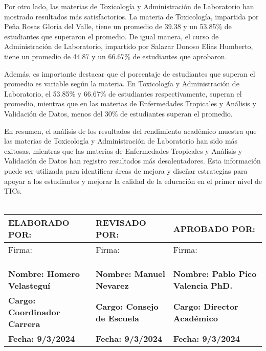 Por otro lado, las materias de Toxicología y Administración de Laboratorio han mostrado resultados más satisfactorios. La materia de Toxicología, impartida por Peña Rosas Gloria del Valle, tiene un promedio de 39.38 y un 53.85\% de estudiantes que superaron el promedio. De igual manera, el curso de Administración de Laboratorio, impartido por Salazar Donoso Elias Humberto, tiene un promedio de 44.87 y un 66.67\% de estudiantes que aprobaron.

Además, es importante destacar que el porcentaje de estudiantes que superan el promedio es variable según la materia. En Toxicología y Administración de Laboratorio, el 53.85\% y 66.67\% de estudiantes respectivamente, superan el promedio, mientras que en las materias de Enfermedades Tropicales y Análisis y Validación de Datos, menos del 30\% de estudiantes superan el promedio.

En resumen, el análisis de los resultados del rendimiento académico muestra que las materias de Toxicología y Administración de Laboratorio han sido más exitosas, mientras que las materias de Enfermedades Tropicales y Análisis y Validación de Datos han registro resultados más desalentadores. Esta información puede ser utilizada para identificar áreas de mejora y diseñar estrategias para apoyar a los estudiantes y mejorar la calidad de la educación en el primer nivel de TICs.\\
\vspace{1cm}\\\begin{tabularx}{\textwidth}{|X|X|X|}
    \hline
    \textbf{ELABORADO POR:} & \textbf{REVISADO POR:} & \textbf{APROBADO POR:} \\ \hline
    Firma: & Firma: & Firma:\\
    &&\\
    &&\\
    &&\\ \hline
    \textbf{Nombre: Homero Velasteguí} & \textbf{Nombre: Manuel Nevarez} & \textbf{Nombre: Pablo Pico Valencia PhD.} \\ \hline
    \textbf{Cargo: Coordinador Carrera} & \textbf{Cargo: Consejo de Escuela} & \textbf{Cargo: Director Académico} \\ \hline
    \textbf{Fecha: 9/3/2024} & \textbf{Fecha: 9/3/2024} & \textbf{Fecha: 9/3/2024} \\ \hline
    \end{tabularx}
